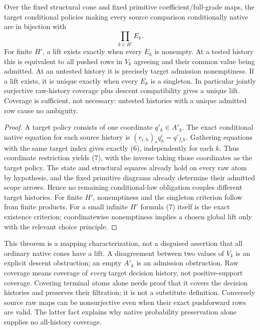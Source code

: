 \documentclass[11pt]{article}
\begin{document}
\begin{theorem}
Over the fixed structural cone and fixed primitive coefficient/full-grade maps, the target conditional policies making every source comparison conditionally native are in bijection with
\[
                         \prod_{k\in H'}E_k.           \tag{7}
\]
For finite $H'$, a lift exists exactly when every $E_k$ is nonempty. At a tested history this is equivalent to all pushed rows in $V_k$ agreeing and their common value being admitted. At an untested history it is precisely target admission nonemptiness. If a lift exists, it is unique exactly when every $E_k$ is a singleton. In particular jointly surjective raw-history coverage plus descent compatibility gives a unique lift. Coverage is sufficient, not necessary: untested histories with a unique admitted row cause no ambiguity.
\end{theorem}
\begin{proof}
A target policy consists of one coordinate $q'_k\in A'_k$. The exact conditional native equation for each source history is $(r_{i,h})_*q_h^i=q'_{f_i h}$. Gathering equations with the same target index gives exactly (6), independently for each $k$. Thus coordinate restriction yields (7), with the inverse taking those coordinates as the target policy. The state and structural squares already hold on every raw atom by hypothesis, and the fixed primitive diagrams already determine their admitted scope arrows. Hence no remaining conditional-law obligation couples different target histories. For finite $H'$, nonemptiness and the singleton criterion follow from finite products. For a small infinite $H'$ formula (7) itself is the exact existence criterion; coordinatewise nonemptiness implies a chosen global lift only with the relevant choice principle.\end{proof}

This theorem is a mapping characterization, not a disguised assertion that all ordinary native cones have a lift. A disagreement between two values of $V_k$ is an explicit descent obstruction; an empty $A'_k$ is an admission obstruction. Raw coverage means coverage of \emph{every} target decision history, not positive-support coverage. Covering terminal atoms alone needs proof that it covers the decision histories and preserves their filtration; it is not a substitute definition. Conversely source raw maps can be nonsurjective even when their exact pushforward rows are valid. The latter fact explains why native probability preservation alone supplies no all-history coverage.
\end{document}
